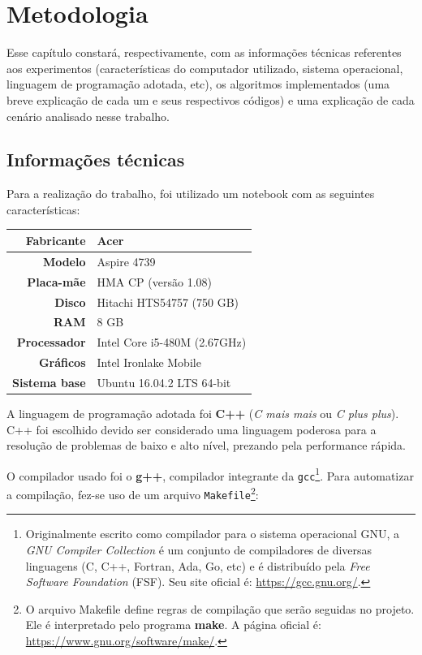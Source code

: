 \chapter{Metodologia}
Esse capítulo constará, respectivamente, com as informações técnicas referentes aos experimentos (características do computador utilizado, sistema operacional, linguagem de programação adotada, etc), os algoritmos implementados (uma breve explicação de cada um e seus respectivos códigos) e uma explicação de cada cenário analisado nesse trabalho.

\section{Informações técnicas}
Para a realização do trabalho, foi utilizado um notebook com as seguintes características:

\begin{tabular}{| r | l |}
	\hline
	\textbf{Fabricante}   & Acer \\
	\hline
	\textbf{Modelo}       & Aspire 4739 \\
	\hline
	\textbf{Placa-mãe}    & HMA CP (versão 1.08) \\
	\hline
	\textbf{Disco}        & Hitachi HTS54757 (750 GB) \\
	\hline
	\textbf{RAM}          & 8 GB \\
	\hline
	\textbf{Processador}  & Intel Core i5-480M (2.67GHz) \\
	\hline
	\textbf{Gráficos}     & Intel Ironlake Mobile \\
	\hline
	\textbf{Sistema base} & Ubuntu 16.04.2 LTS 64-bit \\
	\hline
\end{tabular}

A linguagem de programação adotada foi \textbf{C++} (\textit{C mais mais} ou \textit{C plus plus}). C++ foi escolhido devido ser considerado uma linguagem poderosa para a resolução de problemas de baixo e alto nível, prezando pela performance rápida.

O compilador usado foi o \textbf{g++}, compilador integrante da \texttt{gcc}\footnote{Originalmente escrito como compilador para o sistema operacional GNU, a \textit{GNU Compiler Collection} é um conjunto de compiladores de diversas linguagens (C, C++, Fortran, Ada, Go, etc) e é distribuído pela \textit{Free Software Foundation} (FSF). Seu site oficial é: \url{https://gcc.gnu.org/}.}. Para automatizar a compilação, fez-se uso de um arquivo \texttt{Makefile}\footnote{O arquivo Makefile define regras de compilação que serão seguidas no projeto. Ele é interpretado pelo programa \textbf{make}. A página oficial é: \url{https://www.gnu.org/software/make/}.}:

